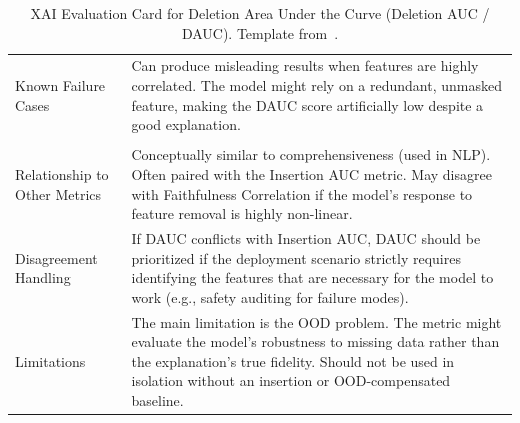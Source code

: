 \begin{table}[t]
\begin{tabularx}{\textwidth}{@{}l X@{}}
Known Failure Cases & Can produce misleading results when features are highly correlated. The model might rely on a redundant, unmasked feature, making the DAUC score artificially low despite a good explanation. \\[3pt]
\addlinespace
\multicolumn{2}{@{}l}{\textbf{IV. Relationships and Limitations}} \\[2pt]
Relationship to Other Metrics & Conceptually similar to comprehensiveness (used in NLP). Often paired with the Insertion AUC metric. May disagree with Faithfulness Correlation if the model's response to feature removal is highly non-linear. \\[3pt]
Disagreement Handling & If DAUC conflicts with Insertion AUC, DAUC should be prioritized if the deployment scenario strictly requires identifying the features that are necessary for the model to work (e.g., safety auditing for failure modes). \\[3pt]
Limitations & The main limitation is the OOD problem. The metric might evaluate the model's robustness to missing data rather than the explanation's true fidelity. Should not be used in isolation without an insertion or OOD-compensated baseline. \\[3pt]
\bottomrule
\end{tabularx}
\caption{XAI Evaluation Card for Deletion Area Under the Curve (Deletion AUC / DAUC). Template from~\cite{gipiskis-kurasova-2026-evaluation}.}
\label{tab:xai-evaluation-card}
\end{table}
